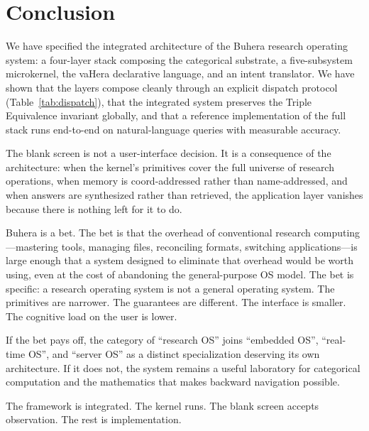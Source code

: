 \documentclass[11pt,twocolumn,a4paper]{article}
\begin{document}
\section{Conclusion}
\label{sec:conclusion}

We have specified the integrated architecture of the Buhera research operating system: a four-layer stack composing the categorical substrate, a five-subsystem microkernel, the vaHera declarative language, and an intent translator. We have shown that the layers compose cleanly through an explicit dispatch protocol (Table~\ref{tab:dispatch}), that the integrated system preserves the Triple Equivalence invariant globally, and that a reference implementation of the full stack runs end-to-end on natural-language queries with measurable accuracy.

The blank screen is not a user-interface decision. It is a consequence of the architecture: when the kernel's primitives cover the full universe of research operations, when memory is coord-addressed rather than name-addressed, and when answers are synthesized rather than retrieved, the application layer vanishes because there is nothing left for it to do.

Buhera is a bet. The bet is that the overhead of conventional research computing---mastering tools, managing files, reconciling formats, switching applications---is large enough that a system designed to eliminate that overhead would be worth using, even at the cost of abandoning the general-purpose OS model. The bet is specific: a research operating system is not a general operating system. The primitives are narrower. The guarantees are different. The interface is smaller. The cognitive load on the user is lower.

If the bet pays off, the category of ``research OS'' joins ``embedded OS'', ``real-time OS'', and ``server OS'' as a distinct specialization deserving its own architecture. If it does not, the system remains a useful laboratory for categorical computation and the mathematics that makes backward navigation possible.

The framework is integrated. The kernel runs. The blank screen accepts observation. The rest is implementation.



\end{document}
